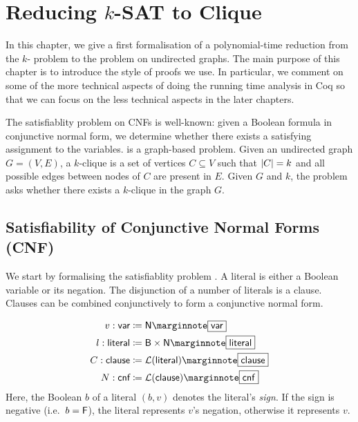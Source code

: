 \newcommand{\varBound}{\textsf{varBound}}
\newcommand{\maxVar}{\textsf{maxVar}}

\chapter{Reducing $k$-SAT to Clique}\label{chap:ksat_clique}
In this chapter, we give a first formalisation of a polynomial-time reduction from the $k$-\SAT{} problem to the \Clique{} problem on undirected graphs. The main purpose of this chapter is to introduce the style of proofs we use. In particular, we comment on some of the more technical aspects of doing the running time analysis in Coq so that we can focus on the less technical aspects in the later chapters.

The satisfiablity problem on CNFs is well-known: given a Boolean formula in conjunctive normal form, we determine whether there exists a satisfying assignment to the variables. 
\Clique{} is a graph-based problem. Given an undirected graph $G = (V, E)$, a $k$-clique is a set of vertices $C \subseteq V$ such that $|C| = k$ and all possible edges between nodes of $C$ are present in $E$. Given $G$ and $k$, the \Clique{} problem asks whether there exists a $k$-clique in the graph $G$. 

\section{Satisfiability of Conjunctive Normal Forms (CNF)}\label{sec:sat}
We start by formalising the satisfiablity problem \SAT{}.
A literal is either a Boolean variable or its negation. The disjunction of a number of literals is a clause. Clauses can be combined conjunctively to form a conjunctive normal form. 

\newcommand*{\bvar}{\textsf{var}}
\newcommand*{\literal}{\textsf{literal}}
\newcommand*{\clause}{\textsf{clause}}
\newcommand*{\cnf}{\textsf{cnf}}
\newcommand*{\assgn}{\textsf{assgn}}
\newcommand*{\eval}{\mathcal{E}}
\newcommand*{\evalA}[2]{\eval~#1~#2}
\begin{align*}
  v : \bvar &\defeq \nat \mnote{\bvar}\\
  l : \literal &\defeq \bool \times \nat \mnote{\literal}\\
  C : \clause &\defeq \listsof{\literal} \mnote{\clause}\\
  N : \cnf &\defeq \listsof{\clause} \mnote{\cnf}
\end{align*}
Here, the Boolean $b$ of a literal $(b, v)$ denotes the literal's \emph{sign}. If the sign is negative (i.e.\ $b = \mathsf{F}$), the literal represents $v$'s negation, otherwise it represents $v$.

